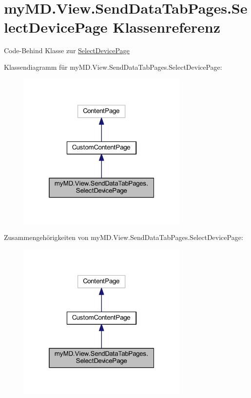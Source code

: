 \hypertarget{classmy_m_d_1_1_view_1_1_send_data_tab_pages_1_1_select_device_page}{}\section{my\+M\+D.\+View.\+Send\+Data\+Tab\+Pages.\+Select\+Device\+Page Klassenreferenz}
\label{classmy_m_d_1_1_view_1_1_send_data_tab_pages_1_1_select_device_page}


Code-\/\+Behind Klasse zur \mbox{\hyperlink{classmy_m_d_1_1_view_1_1_send_data_tab_pages_1_1_select_device_page}{Select\+Device\+Page}}  




Klassendiagramm für my\+M\+D.\+View.\+Send\+Data\+Tab\+Pages.\+Select\+Device\+Page\+:
\nopagebreak
\begin{figure}[H]
\begin{center}
\leavevmode
\includegraphics[width=241pt]{classmy_m_d_1_1_view_1_1_send_data_tab_pages_1_1_select_device_page__inherit__graph}
\end{center}
\end{figure}


Zusammengehörigkeiten von my\+M\+D.\+View.\+Send\+Data\+Tab\+Pages.\+Select\+Device\+Page\+:
\nopagebreak
\begin{figure}[H]
\begin{center}
\leavevmode
\includegraphics[width=241pt]{classmy_m_d_1_1_view_1_1_send_data_tab_pages_1_1_select_device_page__coll__graph}
\end{center}
\end{figure}
